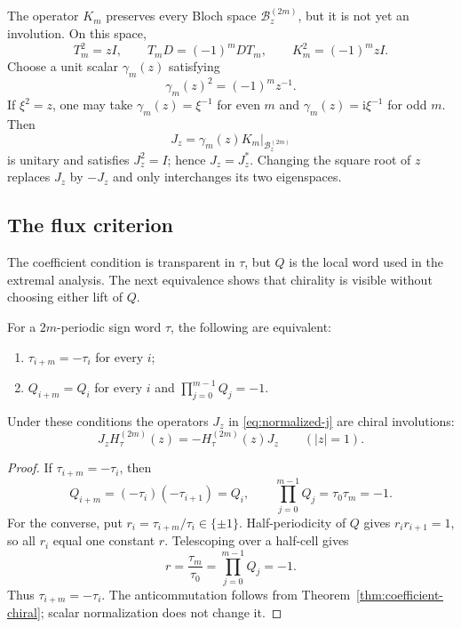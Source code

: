 The operator $K_m$ preserves every Bloch space $\mathcal B_z^{(2m)}$, but it
is not yet an involution.  On this space,
\begin{equation}
 T_m^2=zI,\qquad T_mD=(-1)^mDT_m,\qquad
 K_m^2=(-1)^mzI.
 \label{eq:km-square}
\end{equation}
Choose a unit scalar $\gamma_m(z)$ satisfying
\begin{equation}
 \gamma_m(z)^2=(-1)^m z^{-1}.
 \label{eq:gamma-normalization}
\end{equation}
If $\xi^2=z$, one may take $\gamma_m(z)=\xi^{-1}$ for even $m$ and
$\gamma_m(z)=\mathrm i\xi^{-1}$ for odd $m$.  Then
\begin{equation}
 J_z=\gamma_m(z)K_m|_{\mathcal B_z^{(2m)}}
 \label{eq:normalized-j}
\end{equation}
is unitary and satisfies $J_z^2=I$; hence $J_z=J_z^*$.  Changing the square
root of $z$ replaces $J_z$ by $-J_z$ and only interchanges its two eigenspaces.

\subsection{The flux criterion}

The coefficient condition is transparent in $\tau$, but $Q$ is the local word
used in the extremal analysis.  The next equivalence shows that chirality is
visible without choosing either lift of $Q$.

\begin{theorem}
\label{thm:flux-chiral}
For a $2m$-periodic sign word $\tau$, the following are equivalent:
\begin{enumerate}
 \item $\tau_{i+m}=-\tau_i$ for every $i$;
 \item $Q_{i+m}=Q_i$ for every $i$ and
       $\prod_{j=0}^{m-1}Q_j=-1$.
\end{enumerate}
Under these conditions the operators $J_z$ in
\eqref{eq:normalized-j} are chiral involutions:
\begin{equation}
 J_zH_\tau^{(2m)}(z)=-H_\tau^{(2m)}(z)J_z
 \qquad(|z|=1).
 \label{eq:fiber-anticommutation}
\end{equation}
\end{theorem}

\begin{proof}
If $\tau_{i+m}=-\tau_i$, then
\[
 Q_{i+m}=(-\tau_i)(-\tau_{i+1})=Q_i,
 \qquad
 \prod_{j=0}^{m-1}Q_j=\tau_0\tau_m=-1.
\]
For the converse, put $r_i=\tau_{i+m}/\tau_i\in\{\pm1\}$.  Half-periodicity
of $Q$ gives $r_ir_{i+1}=1$, so all $r_i$ equal one constant $r$.  Telescoping
over a half-cell gives
\[
 r=\frac{\tau_m}{\tau_0}=\prod_{j=0}^{m-1}Q_j=-1.
\]
Thus $\tau_{i+m}=-\tau_i$.  The anticommutation follows from
Theorem~\ref{thm:coefficient-chiral}; scalar normalization does not change it.
\end{proof}


